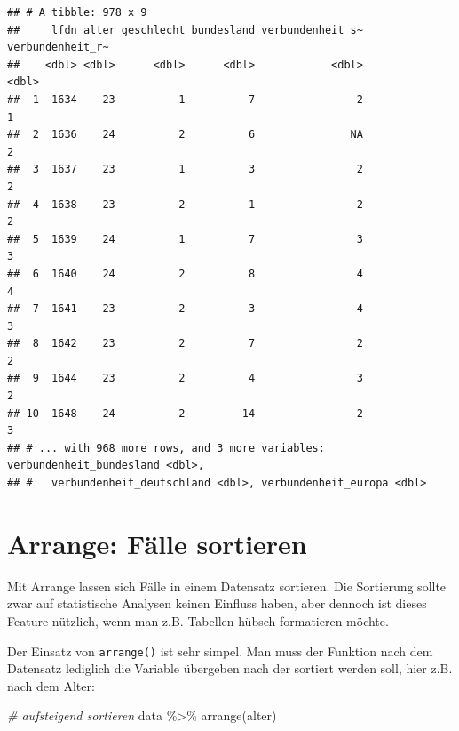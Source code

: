 \documentclass[
]{book}
\newenvironment{Shaded}{\begin{snugshade}}{\end{snugshade}}
\newcommand{\CommentTok}[1]{\textcolor[rgb]{0.56,0.35,0.01}{\textit{#1}}}
\newcommand{\FunctionTok}[1]{\textcolor[rgb]{0.00,0.00,0.00}{#1}}
\newcommand{\NormalTok}[1]{#1}
\newcommand{\SpecialCharTok}[1]{\textcolor[rgb]{0.00,0.00,0.00}{#1}}
\begin{document}
\begin{verbatim}
## # A tibble: 978 x 9
##     lfdn alter geschlecht bundesland verbundenheit_s~ verbundenheit_r~
##    <dbl> <dbl>      <dbl>      <dbl>            <dbl>            <dbl>
##  1  1634    23          1          7                2                1
##  2  1636    24          2          6               NA                2
##  3  1637    23          1          3                2                2
##  4  1638    23          2          1                2                2
##  5  1639    24          1          7                3                3
##  6  1640    24          2          8                4                4
##  7  1641    23          2          3                4                3
##  8  1642    23          2          7                2                2
##  9  1644    23          2          4                3                2
## 10  1648    24          2         14                2                3
## # ... with 968 more rows, and 3 more variables: verbundenheit_bundesland <dbl>,
## #   verbundenheit_deutschland <dbl>, verbundenheit_europa <dbl>
\end{verbatim}

\hypertarget{arrange-fuxe4lle-sortieren}{%
\section{Arrange: Fälle sortieren}\label{arrange-fuxe4lle-sortieren}}

Mit Arrange lassen sich Fälle in einem Datensatz sortieren. Die Sortierung sollte zwar auf statistische Analysen keinen Einfluss haben, aber dennoch ist dieses Feature nützlich, wenn man z.B. Tabellen hübsch formatieren möchte.

Der Einsatz von \texttt{arrange()} ist sehr simpel. Man muss der Funktion nach dem Datensatz lediglich die Variable übergeben nach der sortiert werden soll, hier z.B. nach dem Alter:

\begin{Shaded}
\begin{Highlighting}[]
\CommentTok{\# aufsteigend sortieren}
\NormalTok{data }\SpecialCharTok{\%\textgreater{}\%} 
  \FunctionTok{arrange}\NormalTok{(alter)}
\end{Highlighting}
\end{Shaded}
\end{document}
